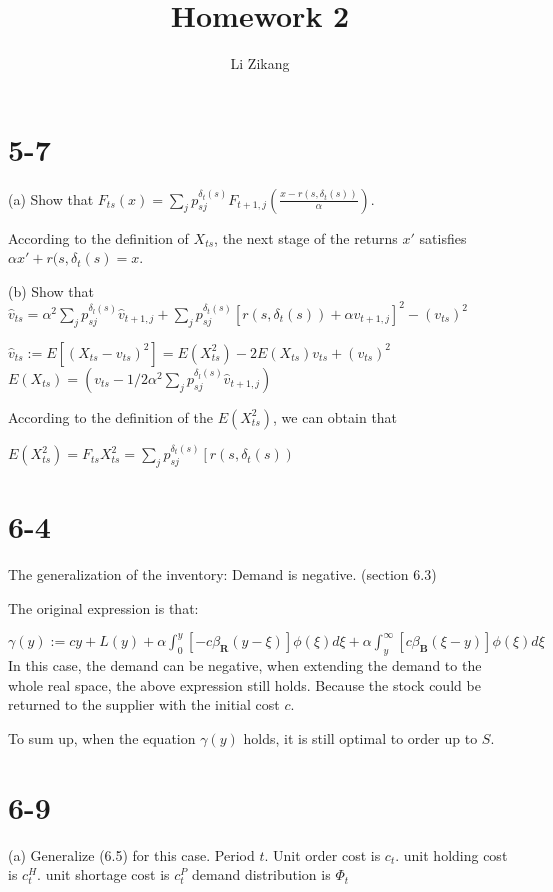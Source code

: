 \documentclass[UTF8]{article}
\author {Li Zikang}
\title {Homework 2}
\date{}
\begin{document}
    \maketitle
\section*{5-7}

(a) Show that $F_{t s}(x)=\sum_{j} p_{s j}^{\delta_{t}(s)} F_{t+1, j}\left(\frac{x-r\left(s, \delta_{t}(s)\right)}{\alpha}\right)$.

According to the definition of $X_{t s}$, the next stage of the returns $x'$ satisfies $\alpha x' + r(s, \delta_{t}(s) = x$.

(b) Show that $\hat{v}_{t s}=\alpha^{2} \sum_{j} p_{s j}^{\delta_{l}(s)} \hat{v}_{t+1, j}+\sum_{j} p_{s j}^{\delta_{t}(s)}\left[r\left(s, \delta_{t}(s)\right)+\alpha v_{t+1, j}\right]^{2}-\left(v_{t s}\right)^{2}$

$\hat{v}_{t s}:=E\left[\left(X_{t s}-v_{t s}\right)^{2}\right] = E(X_{t s}^2) - 2 E(X_{t s}) v_{t s} + (v_{t s})^2$ \\

$E(X_{t s}) = (v_{t s}- 1/2 \alpha^{2} \sum_{j} p_{s j}^{\delta_{l}(s)} \hat{v}_{t+1, j})$

According to the definition of the $E(X_{t s}^2)$, we can obtain that

$E(X_{t s}^2) = F_{t s} X_{t s}^2 = \sum_{j} p_{s j}^{\delta_{t}(s)}\left[r\left(s, \delta_{t}(s)\right)$

\section*{6-4}
The generalization of the inventory: Demand is negative. (section 6.3)

The original expression is that:

$\gamma(y):=c y+L(y)+\alpha \int_{0}^{y}\left[-c \beta_{\mathbf{R}}(y-\xi)\right] \phi(\xi) d \xi+\alpha \int_{y}^{\infty}\left[c \beta_{\mathbf{B}}(\xi-y)\right] \phi(\xi) d \xi$
In this case, the demand can be negative, when extending the demand to the whole real space, the above expression still holds. Because the stock could be returned to the supplier with the initial cost $c$.

To sum up, when the equation $\gamma(y)$ holds, it is still optimal to order up to $S$.

\section*{6-9}
(a) Generalize (6.5) for this case.
Period $t$.
Unit order cost is $c_t$.
unit holding cost is $c_t^H$.
unit shortage cost is $c_t^P$
demand distribution is $\Phi_t$
\end{document}
